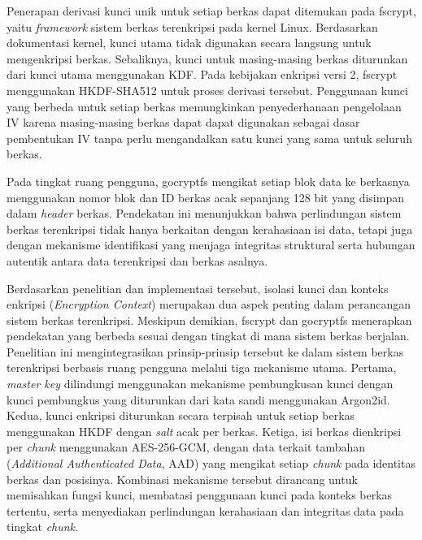 Penerapan derivasi kunci unik untuk setiap berkas dapat ditemukan pada fscrypt, yaitu \textit{framework} sistem berkas terenkripsi pada kernel Linux. Berdasarkan dokumentasi kernel\cite{fscrypt}, kunci utama tidak digunakan secara langsung untuk mengenkripsi berkas. Sebaliknya, kunci untuk masing-masing berkas diturunkan dari kunci utama menggunakan KDF. Pada kebijakan enkripsi versi 2, fscrypt menggunakan HKDF-SHA512 untuk proses derivasi tersebut. Penggunaan kunci yang berbeda untuk setiap berkas memungkinkan penyederhanaan pengelolaan IV karena masing-masing berkas dapat dapat digunakan sebagai dasar pembentukan IV tanpa perlu mengandalkan satu kunci yang sama untuk seluruh berkas.

Pada tingkat ruang pengguna, gocryptfs\cite{gocryptfs} mengikat setiap blok data ke berkasnya menggunakan nomor blok dan ID berkas acak sepanjang 128 bit yang disimpan dalam \textit{header} berkas. Pendekatan ini menunjukkan bahwa perlindungan sistem berkas terenkripsi tidak hanya berkaitan dengan kerahasiaan isi data, tetapi juga dengan mekanisme identifikasi yang menjaga integritas struktural serta hubungan autentik antara data terenkripsi dan berkas asalnya.

Berdasarkan penelitian dan implementasi tersebut, isolasi kunci dan konteks enkripsi (\textit{Encryption Context}) merupakan dua aspek penting dalam perancangan sistem berkas terenkripsi. Meskipun demikian, fscrypt dan gocryptfs menerapkan pendekatan yang berbeda sesuai dengan tingkat di mana sistem berkas berjalan. Penelitian ini mengintegrasikan prinsip-prinsip tersebut ke dalam sistem berkas terenkripsi berbasis ruang pengguna melalui tiga mekanisme utama. Pertama, \textit{master key} dilindungi menggunakan mekanisme pembungkusan kunci dengan kunci pembungkus yang diturunkan dari kata sandi menggunakan Argon2id. Kedua, kunci enkripsi diturunkan secara terpisah untuk setiap berkas menggunakan HKDF dengan \textit{salt} acak per berkas. Ketiga, isi berkas dienkripsi per \textit{chunk} menggunakan AES-256-GCM, dengan data terkait tambahan (\textit{Additional Authenticated Data}, AAD) yang mengikat setiap \textit{chunk} pada identitas berkas dan posisinya. Kombinasi mekanisme tersebut dirancang untuk memisahkan fungsi kunci, membatasi penggunaan kunci pada konteks berkas tertentu, serta menyediakan perlindungan kerahasiaan dan integritas data pada tingkat \textit{chunk}.

